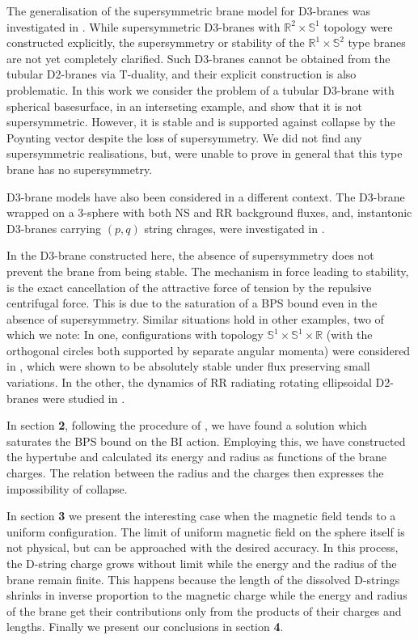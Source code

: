 \documentclass[a4paper,12pt]{article}
\begin{document}
The generalisation of the supersymmetric brane model for D3-branes was investigated in \cite{dual, bak2, hel}. While supersymmetric D3-branes with $\mathbb{R}^2\times\mathbb{S}^1$ topology were constructed explicitly, the supersymmetry or stability of the $\mathbb{R}^1\times\mathbb{S}^2$ type branes are not yet completely clarified. Such D3-branes cannot be obtained from the tubular D2-branes via T-duality, and their explicit construction is also problematic\cite{hel, flux}. In this work we consider the problem of a tubular D3-brane with spherical basesurface, in an interseting example, and show that it is not supersymmetric. However, it is stable and is supported against collapse by the Poynting vector despite the loss of supersymmetry. We did not find any supersymmetric realisations, but, were unable to prove in general that this type brane has no supersymmetry.

D3-brane models have also been considered in a different context. The D3-brane wrapped on a 3-sphere with both NS and RR background fluxes, and, instantonic D3-branes carrying $(p,q)$ string chrages, were investigated in \cite{evs2,evs}.

In the D3-brane constructed here, the absence of supersymmetry does not prevent the brane from being stable. The mechanism in force leading to stability, is the exact cancellation of the attractive force of tension by the repulsive centrifugal force. This is due to the saturation of a BPS bound even in the absence of supersymmetry. Similar situations hold in other examples, two of  which we note: In one, configurations with topology $\mathbb{S}^1\times\mathbb{S}^1\times\mathbb{R}$ (with the orthogonal circles both supported by separate angular momenta) were considered in \cite{per}, which were shown to be absolutely stable under flux preserving small variations. In the other, the dynamics of RR radiating rotating ellipsoidal D2-branes were studied in \cite{har}.

In section {\bf 2}, following the procedure of \cite{tub, emt, bak1, cts, hel, surp}, we have found a solution which saturates the BPS bound on the BI action.  Employing this, we have constructed the hypertube and calculated its energy and radius as functions of the brane charges. The relation between the radius and the charges then expresses the impossibility of collapse.

In section {\bf 3} we present the interesting case when the magnetic field tends to a uniform configuration. The limit of uniform magnetic field on the sphere itself is not physical, but can be approached with the desired accuracy. In this process, the D-string charge grows without limit while the energy and the radius of the brane remain finite. This happens because the length of the dissolved D-strings shrinks in inverse proportion to the magnetic charge while the energy and radius of the brane get their contributions only from the products of their charges and lengths. Finally we present our conclusions in section {\bf 4}.
\end{document}
